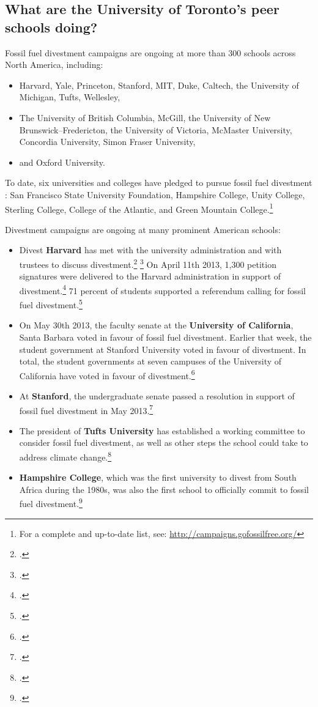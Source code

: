 	
	\subsection{What are the University of Toronto's peer schools doing?}
	\label{PeerSchools}



Fossil fuel divestment campaigns are ongoing at more than 300 schools across North America, including:
\begin{itemize}
	\item Harvard, Yale, Princeton, Stanford, MIT, Duke, Caltech, the University of Michigan, Tufts, Wellesley,
	\item The University of British Columbia, McGill, the University of New Brunswick--Fredericton, the University of Victoria, McMaster University, Concordia University, Simon Fraser University,
	\item and Oxford University.
\end{itemize}
To date, six universities and colleges have pledged to pursue fossil fuel divestment : San Francisco State University Foundation, Hampshire College, Unity College, Sterling College, College of the Atlantic, and Green Mountain College.\footnote{For a complete and up-to-date list, see: \url{http://campaigns.gofossilfree.org/}}


Divestment campaigns are ongoing at many prominent American schools:
\begin{itemize}
	\item Divest \textbf{Harvard} has met with the university administration and with trustees to discuss divestment.\footcite[][]{HarvardMeeting} \footcite[][]{HarvardTrustees} On April 11th 2013, 1,300 petition signatures were delivered to the Harvard administration in support of divestment.\footcite[][]{HarvardPetition} 71 percent of students supported a referendum calling for fossil fuel divestment.\footcite[][]{StudentsClamoring}
	\item On May 30th 2013, the faculty senate at the \textbf{University of California}, Santa Barbara voted in favour of fossil fuel divestment. Earlier that week, the student government at Stanford University voted in favour of divestment. In total, the student governments at seven campuses of the University of California have voted in favour of divestment.\footcite[][]{UCSB2013}
	\item At \textbf{Stanford}, the undergraduate senate passed a resolution in support of fossil fuel divestment in May 2013.\footcite[][]{StanfordSenate}
	\item The president of \textbf{Tufts University} has established a working committee to consider fossil fuel divestment, as well as other steps the school could take to address climate change.\footcite[][]{TuftsDivest}
	\item \textbf{Hampshire College}, which was the first university to divest from South Africa during the 1980s, was also the first school to officially commit to fossil fuel divestment.\footcite[][]{StudentsClamoring}
\end{itemize}



